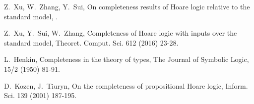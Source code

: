 \documentclass[a4paper,11pt]{article}
\begin{document}
\begin{thebibliography}{99}
Z.~Xu, W.~Zhang, Y.~Sui,
\newblock On completeness results of Hoare logic relative to the standard model,
\newblock .

Z.~Xu, Y.~Sui, W.~Zhang,
\newblock Completeness of Hoare logic with inputs over the standard model,
\newblock Theoret. Comput. Sci. 612 (2016) 23-28.

L.~Henkin,
\newblock Completeness in the theory of types,
\newblock The Journal of Symbolic Logic, 15/2 (1950) 81-91.

D.~Kozen, J.~Tiuryn,
\newblock On the completeness of propositional Hoare logic,
\newblock Inform. Sci. 139 (2001) 187-195.

\end{thebibliography}
\end{document}
